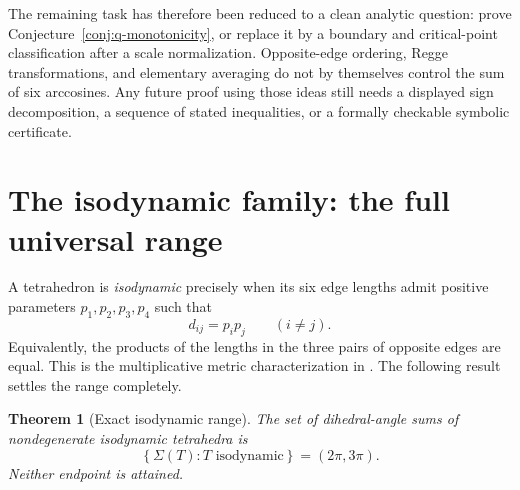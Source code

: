 \documentclass[11pt,a4paper]{article}
\newtheorem{theorem}{Theorem}[section]
\theoremstyle{definition}
\theoremstyle{remark}
\begin{document}
The remaining task has therefore been reduced to a clean analytic question:
prove Conjecture~\ref{conj:q-monotonicity}, or replace it by a boundary and
critical-point classification after a scale normalization.  Opposite-edge
ordering, Regge transformations, and elementary averaging do not by
themselves control the sum of six arccosines.  Any future proof using those
ideas still needs a displayed sign decomposition, a sequence of stated
inequalities, or a formally checkable symbolic certificate.

\section{The isodynamic family: the full universal range}
\label{sec:isodynamic}

A tetrahedron is \emph{isodynamic} precisely when its six edge lengths admit
positive parameters $p_1,p_2,p_3,p_4$ such that
\begin{equation}\label{eq:isodynamic-metric}
 d_{ij}=p_i p_j \qquad (i\ne j).
\end{equation}
Equivalently, the products of the lengths in the three pairs of opposite
edges are equal.  This is the multiplicative metric characterization in
\cite[Theorem~4]{HajjaHammoudeh2014}.  The following result settles the
range completely.

\begin{theorem}[Exact isodynamic range]\label{thm:isodynamic-range}
The set of dihedral-angle sums of nondegenerate isodynamic tetrahedra is
\begin{equation}\label{eq:isodynamic-range}
 \boxed{
 \left\{\Sigma(T):T\text{ isodynamic}\right\}=(2\pi,3\pi).
 }
\end{equation}
Neither endpoint is attained.
\end{theorem}
\end{document}
